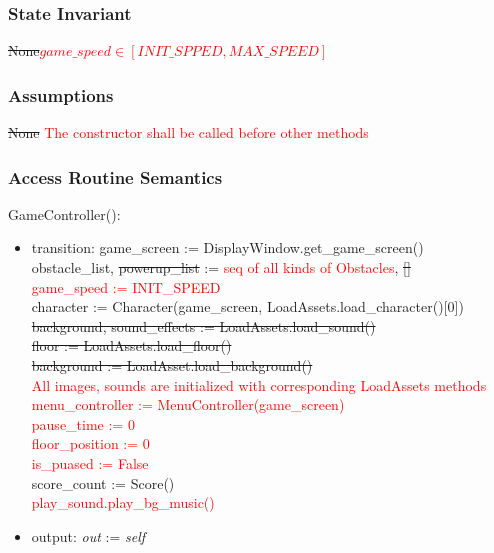 \documentclass[12pt]{article}
\begin{document}
\subsubsection* {State Invariant}

\sout{None}\textcolor{red}{$game\_speed \in [INIT\_SPPED, MAX\_SPEED]$}

\subsubsection* {Assumptions}

\sout{None} \textcolor{red}{The constructor shall be called before other methods}

\subsubsection* {Access Routine Semantics}

GameController():
\begin{itemize}
    \item transition: game\_screen := DisplayWindow.get\_game\_screen()\\
    obstacle\_list, \sout{powerup\_list} := \textcolor{red}{seq of all kinds of Obstacles}, \sout{[]}\\
    \textcolor{red}{game\_speed := INIT\_SPEED}\\
    character := Character(game\_screen, LoadAssets.load\_character()[0])\\
    \sout{background, sound\_effects := LoadAssets.load\_sound()\\
    floor := LoadAssets.load\_floor()\\
    background := LoadAsset.load\_background()\\}
    \textcolor{red}{All images, sounds are initialized with corresponding LoadAssets methods}\\
    \textcolor{red}{menu\_controller := MenuController(game\_screen)}\\
    \textcolor{red}{pause\_time := 0}\\
    \textcolor{red}{floor\_position := 0}\\
    \textcolor{red}{is\_puased := False}\\
    score\_count := Score()\\
    \textcolor{red}{play\_sound.play\_bg\_music()}
    \item output: \textit{out} := \textit{self}
\end{itemize}
\end{document}
